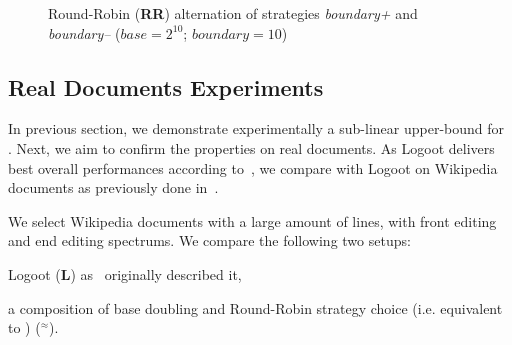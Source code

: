 \begin{figure}
\small
\begin{center}

\caption{Round-Robin (\textbf{RR}) alternation of strategies \emph{boundary+}
  and \emph{boundary--} ($base=2^{10}$; $boundary=10$)}
\label{fig:roundrobinexperiment}
\end{center}
\end{figure}

\subsection{Real Documents Experiments}

In previous section, we demonstrate experimentally a sub-linear upper-bound for
\NAME{}. Next, we aim to confirm the \NAME{} properties on real documents. As
Logoot delivers best overall performances according
to~\cite{ahmed2011evaluating}, we compare \NAME{} with Logoot on Wikipedia
documents as previously done in~\cite{DBLP:journals/tpds/WeissUM10}.

We select Wikipedia documents with a large amount of lines, with front editing
and end editing spectrums. We compare the following two setups:
\begin{inparaenum}[(1)]
  \item Logoot (\textbf{L}) as~\cite{weiss2009logoot} originally described it,
  \item a composition of base doubling and Round-Robin strategy choice
    (i.e. equivalent to \NAME{}) (\textbf{\NAME{}}$^\approx$).
\end{inparaenum}

